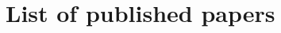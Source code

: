 \documentclass[11pt,twocolumn]{article}
\begin{document}
\nocite{*}
\section{List of published papers}


\end{document}
